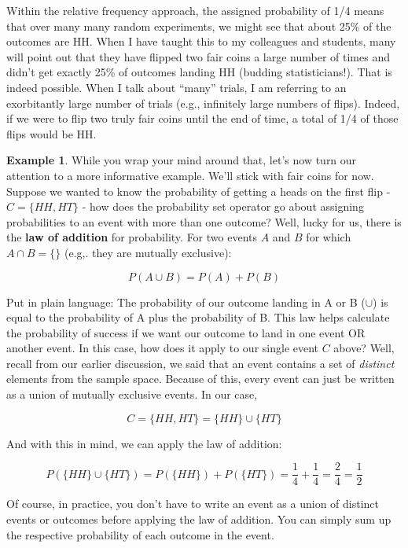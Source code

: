 \documentclass[
]{book}
\theoremstyle{definition}
\theoremstyle{definition}
\newtheorem{example}{Example}[chapter]
\theoremstyle{definition}
\theoremstyle{definition}
\theoremstyle{remark}
\begin{document}
Within the relative frequency approach, the assigned probability of 1/4 means that over many many random experiments, we might see that about 25\% of the outcomes are HH. When I have taught this to my colleagues and students, many will point out that they have flipped two fair coins a large number of times and didn't get exactly 25\% of outcomes landing HH (budding statisticians!). That is indeed possible. When I talk about ``many'' trials, I am referring to an exorbitantly large number of trials (e.g., infinitely large numbers of flips). Indeed, if we were to flip two truly fair coins until the end of time, a total of 1/4 of those flips would be HH.

\begin{example}
While you wrap your mind around that, let's now turn our attention to a more informative example. We'll stick with fair coins for now. Suppose we wanted to know the probability of getting a heads on the first flip - \(C = \{HH,HT\}\) - how does the probability set operator go about assigning probabilities to an event with more than one outcome? Well, lucky for us, there is the \textbf{law of addition} for probability. For two events \(A\) and \(B\) for which \(A \cap B = \{\}\) (e.g,. they are mutually exclusive):

\[ P(A \cup B) = P(A) + P(B) 
\label{eq:addlaw}\]

Put in plain language: The probability of our outcome landing in A or B (\(\cup\)) is equal to the probability of A plus the probability of B. This law helps calculate the probability of success if we want our outcome to land in one event OR another event. In this case, how does it apply to our single event \(C\) above? Well, recall from our earlier discussion, we said that an event contains a set of \emph{distinct} elements from the sample space. Because of this, every event can just be written as a union of mutually exclusive events. In our case,

\[ C = \{HH,HT\} = \{HH\} \cup \{HT\} \]

And with this in mind, we can apply the law of addition:

\[ P(\{HH\} \cup \{HT\}) = P(\{HH\}) + P(\{HT\}) = \frac{1}{4} + \frac{1}{4} = \frac{2}{4} = \frac{1}{2} \]
\end{example}

Of course, in practice, you don't have to write an event as a union of distinct events or outcomes before applying the law of addition. You can simply sum up the respective probability of each outcome in the event.
\end{document}
